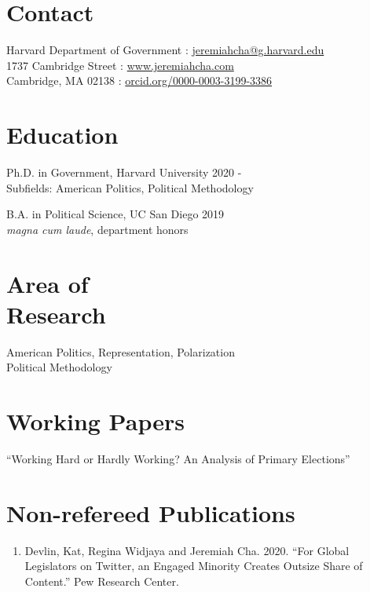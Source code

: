 \documentclass[margin, line]{res}
\begin{document}
\begin{resume}

\section{Contact} 
Harvard Department of Government \hfill \Letter: \href{mailto:jeremiahcha@g.harvard.edu}{jeremiahcha@g.harvard.edu}\\
1737 Cambridge Street \hfill \Mundus: \href{httsp://www.jeremiahcha.com}{www.jeremiahcha.com}\\
Cambridge, MA 02138 \hfill \Mundus: \href{https://orcid.org/0000-0003-3199-3386}{orcid.org/0000-0003-3199-3386}

\section{Education} 
Ph.D. in Government, Harvard University \hfill 2020 - \\
\hspace*{5mm}Subfields: American Politics, Political Methodology

B.A. in Political Science, UC San Diego \hfill 2019\\
\hspace*{5mm}\textit{magna cum laude}, department honors

\section{Area of \\Research} 
American Politics, Representation, Polarization\\
Political Methodology

\section{Working Papers} 
``Working Hard or Hardly Working? An Analysis of Primary Elections''

\section{Non-refereed Publications}
\begin{enumerate}

\item Devlin, Kat, Regina Widjaya and Jeremiah Cha. 2020. ``For Global Legislators on Twitter, an Engaged Minority Creates Outsize Share of Content.'' Pew Research Center. 


\end{enumerate}
\end{resume}
\end{document}
